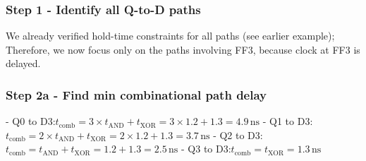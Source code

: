\documentclass[12pt,openany]{book}
\begin{document}
\subsubsection*{Step 1 - Identify all Q-to-D paths}
\begin{minipage}[htp]{0.5\textwidth}

\begin{justify}
		We already verified hold-time constraints for all paths (see earlier example); \newline
		Therefore, we now focus only on the paths involving FF3, because clock at FF3 is delayed.
\end{justify}

	\subsubsection*{Step 2a - Find min combinational path delay}
	\begin{justify}
			- Q0 to D3:\newline \( t_{\text{comb}} = 3 \times t_{\text{AND}} + t_{\text{XOR}} = 3 \times 1.2 + 1.3 = 4.9 \, \text{ns} \)\newline
			- Q1 to D3:\newline \( t_{\text{comb}} = 2 \times t_{\text{AND}} + t_{\text{XOR}} = 2 \times 1.2 + 1.3 = 3.7 \, \text{ns} \)\newline
			- Q2 to D3:\newline \( t_{\text{comb}} = t_{\text{AND}} + t_{\text{XOR}} = 1.2 + 1.3 = 2.5 \, \text{ns} \)\newline
			- Q3 to D3:\newline \( t_{\text{comb}} = t_{\text{XOR}} = 1.3 \, \text{ns} \)
	\end{justify}
\end{minipage}%
\hfill
\vline
\hfill
\end{document}
